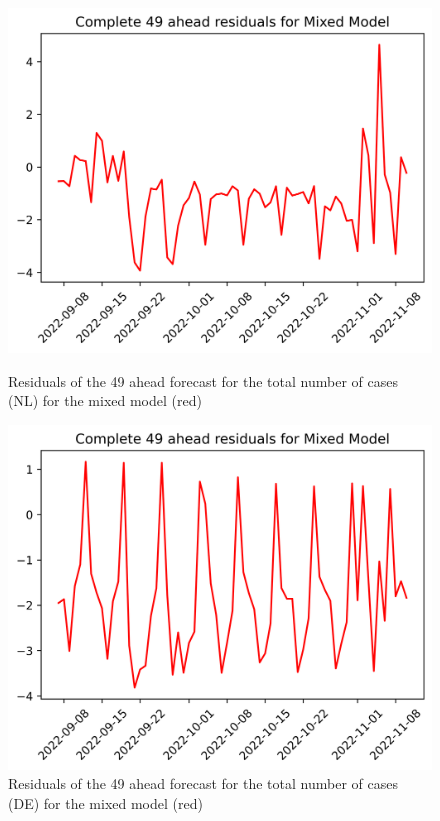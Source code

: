 \begin{figure}

\begin{minipage}{.45\textwidth}
  \centering
  \includegraphics[width=\linewidth]{pics/49_ah/49_ahead_errors_Mixed Model.png}
  \caption{Residuals of the 49 ahead forecast for the total number of cases (NL) for the mixed model (red)}
  \label{fig:tot_cases_error_49_mix}
\end{minipage}
\begin{minipage}{.45\textwidth}
  \centering
  \includegraphics[width=\linewidth]{pics/49_ah/DE_49_ahead_errors_Mixed Model.png}
  \caption{Residuals of the 49 ahead forecast for the total number of cases (DE) for the mixed model (red)}
  \label{fig:tot_cases_error_49_mix_DE}
\end{minipage}

\end{figure}
